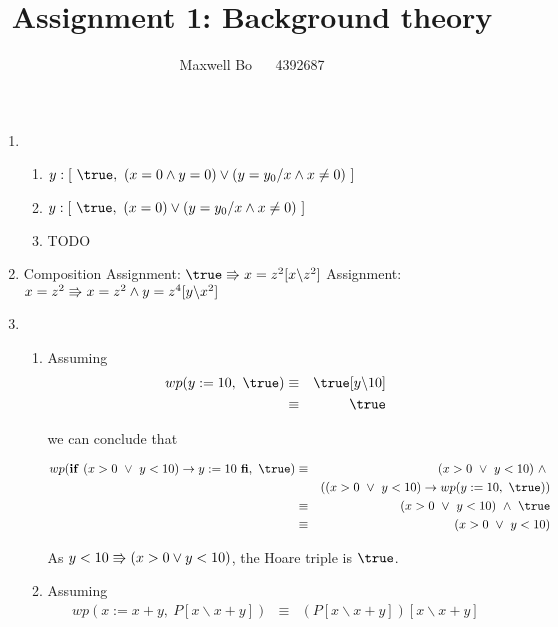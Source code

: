 \documentclass{article}
\title{\bf Assignment 1: Background theory}
\author{Maxwell Bo  ~~ 4392687}
\begin{document}
\maketitle

\begin{enumerate}
\item 
    \begin{enumerate}
    \item $y: [\ \true,\ (x = 0 \land y = 0) \lor (y = y_0 / x \land x \neq 0)\ ]$
    \item $y: [\ \true,\ (x = 0) \lor (y = y_0 / x \land x \neq 0)\ ]$
    \item TODO
    \end{enumerate}

\item 
    \DERIVE
     {Composition}
     {Assignment: $\true \entails x = z^2 [x \backslash z^2]$}
     {Assignment: $x = z^2 \Rrightarrow x = z^2 \land y = z ^ 4[y \backslash x^2]$}
    \ENDDERIVE

\item
    \begin{enumerate}
    \item Assuming
        \begin{eqnarray*}
            wp(y := 10,\ \true) & \equiv & \true[y \backslash 10]\\
                               & \equiv & \true
        \end{eqnarray*} 

        we can conclude that 

        \begin{eqnarray*}
            wp(\If~ (x > 0 ~\lor~ y < 10) \rightarrow y:= 10\ \Fi,\ \true) & \equiv & (x > 0 ~\lor~ y < 10) ~\land~ \\
                & & ((x > 0 ~\lor~ y < 10) \rightarrow wp(y := 10,\ \true))\\
            & \equiv & (x > 0 ~\lor~ y < 10) ~\land~ \true\\
            & \equiv & (x > 0 ~\lor~ y < 10)
        \end{eqnarray*}

        As $y < 10 \Rrightarrow (x > 0 \lor y < 10)$, the Hoare triple is $\true$.

    \item Assuming
        \begin{eqnarray*}
            wp(x := x + y,\ P[x \backslash x + y]) & \equiv & (P[x \backslash x + y])[x \backslash x + y]\\
        \end{eqnarray*}


\end{enumerate}
\end{enumerate}
\end{document}
